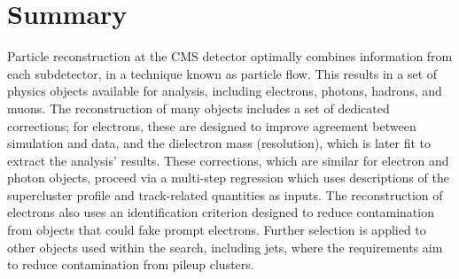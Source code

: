 \section{Summary}

Particle reconstruction at the CMS detector optimally combines information from each subdetector, in a technique known as particle flow. This results in a set of physics objects available for analysis, including electrons, photons, hadrons, and muons. The reconstruction of many objects includes a set of dedicated corrections; for electrons, these are designed to improve agreement between simulation and data, and the dielectron mass (resolution), which is later fit to extract the analysis' results. These corrections, which are similar for electron and photon objects, proceed via a multi-step regression which uses descriptions of the supercluster profile and track-related quantities as inputs. The reconstruction of electrons also uses an identification criterion designed to reduce contamination from objects that could fake prompt electrons. Further selection is applied to other objects used within the \Hee search, including jets, where the requirements aim to reduce contamination from pileup clusters. 




